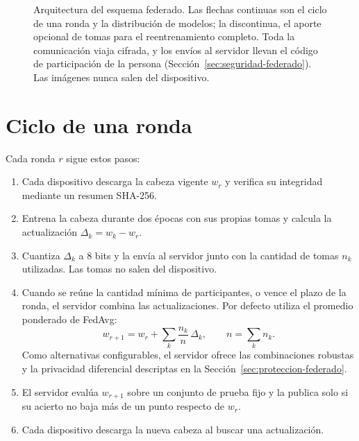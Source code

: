 \begin{figure}[h]
\caption{Arquitectura del esquema federado. Las flechas continuas son el ciclo de una ronda y la distribución de modelos; la discontinua, el aporte opcional de tomas para el reentrenamiento completo. Toda la comunicación viaja cifrada, y los envíos al servidor llevan el código de participación de la persona (Sección~\ref{sec:seguridad-federado}). Las imágenes nunca salen del dispositivo.}
\label{fig:arquitectura-federado}
\end{figure}

\section{Ciclo de una ronda}

Cada ronda $r$ sigue estos pasos:

\begin{enumerate}
    \item Cada dispositivo descarga la cabeza vigente $w_r$ y verifica su integridad mediante un resumen SHA-256.
    \item Entrena la cabeza durante dos épocas con sus propias tomas y calcula la actualización $\Delta_k = w_k - w_r$.
    \item Cuantiza $\Delta_k$ a 8 bits y la envía al servidor junto con la cantidad de tomas $n_k$ utilizadas. Las tomas no salen del dispositivo.
    \item Cuando se reúne la cantidad mínima de participantes, o vence el plazo de la ronda, el servidor combina las actualizaciones. Por defecto utiliza el promedio ponderado de FedAvg:
    \begin{equation}
        w_{r+1} = w_r + \sum_{k} \frac{n_k}{n}\,\Delta_k, \qquad n = \sum_k n_k.
    \end{equation}
    Como alternativas configurables, el servidor ofrece las combinaciones robustas y la privacidad diferencial descriptas en la Sección~\ref{sec:proteccion-federado}.
    \item El servidor evalúa $w_{r+1}$ sobre un conjunto de prueba fijo y la publica solo si su acierto no baja más de un punto respecto de $w_r$.
    \item Cada dispositivo descarga la nueva cabeza al buscar una actualización.
\end{enumerate}

